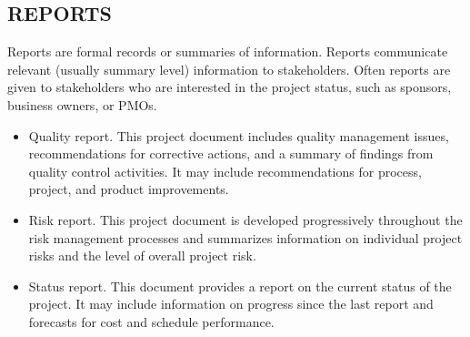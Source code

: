 \documentclass[11pt]{article}
\begin{document}
\subsection{REPORTS}
\label{sec:org15493c1}
Reports are formal records or summaries of information. Reports communicate relevant (usually summary level) information to stakeholders. Often reports are given to stakeholders who are interested in the project status, such as sponsors, business owners, or PMOs.
\begin{itemize}
\item Quality report. This project document includes quality management issues, recommendations for corrective actions, and a summary of findings from quality control activities. It may include recommendations for process, project, and product improvements.
\item Risk report. This project document is developed progressively throughout the risk management processes and summarizes information on individual project risks and the level of overall project risk.
\item Status report. This document provides a report on the current status of the project. It may include information on progress since the last report and forecasts for cost and schedule performance.
\end{itemize}
\end{document}
